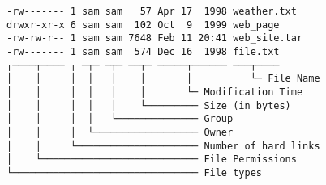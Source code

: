 \documentclass[varwidth,crop]{standalone}
\begin{document}
\begin{verbatim}
-rw------- 1 sam sam   57 Apr 17  1998 weather.txt
drwxr-xr-x 6 sam sam  102 Oct  9  1999 web_page
-rw-rw-r-- 1 sam sam 7648 Feb 11 20:41 web_site.tar
-rw------- 1 sam sam  574 Dec 16  1998 file.txt
╷────┬──── ╷ ─┬─ ─┬─ ──┬─ ─────┬────── ───┬────
│    │     │  │   │    │       │          └─ File Name
│    │     │  │   │    │       └─ Modification Time
│    │     │  │   │    └───────── Size (in bytes)
│    │     │  │   └────────────── Group
│    │     │  └────────────────── Owner
│    │     └───────────────────── Number of hard links
│    └─────────────────────────── File Permissions
└──────────────────────────────── File types
\end{verbatim}
\end{document}

